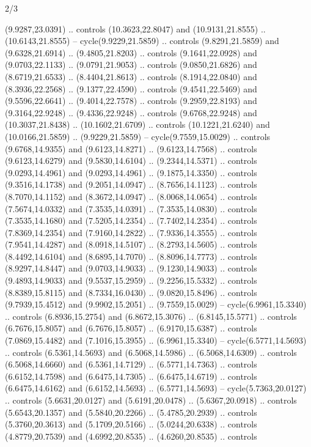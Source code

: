 \begin{flagdescription}{2/3}
\begin{scope}[yshift=\flagwidth,scale=\flagwidth/1241.93737]
\begin{scope}[y=-1mm, x=1mm,draw=gold,fill=blue,line join=miter,miter limit=4,line width=1.8\lw]
{  (9.9287,23.0391) .. controls (10.3623,22.8047) and (10.9131,21.8555) ..
  (10.6143,21.8555) -- cycle(9.9229,21.5859) .. controls (9.8291,21.5859) and
  (9.6328,21.6914) .. (9.4805,21.8203) .. controls (9.1641,22.0928) and
  (9.0703,22.1133) .. (9.0791,21.9053) .. controls (9.0850,21.6826) and
  (8.6719,21.6533) .. (8.4404,21.8613) .. controls (8.1914,22.0840) and
  (8.3936,22.2568) .. (9.1377,22.4590) .. controls (9.4541,22.5469) and
  (9.5596,22.6641) .. (9.4014,22.7578) .. controls (9.2959,22.8193) and
  (9.3164,22.9248) .. (9.4336,22.9248) .. controls (9.6768,22.9248) and
  (10.3037,21.8438) .. (10.1602,21.6709) .. controls (10.1221,21.6240) and
  (10.0166,21.5859) .. (9.9229,21.5859) -- cycle(9.7559,15.0029) .. controls
  (9.6768,14.9355) and (9.6123,14.8271) .. (9.6123,14.7568) .. controls
  (9.6123,14.6279) and (9.5830,14.6104) .. (9.2344,14.5371) .. controls
  (9.0293,14.4961) and (9.0293,14.4961) .. (9.1875,14.3350) .. controls
  (9.3516,14.1738) and (9.2051,14.0947) .. (8.7656,14.1123) .. controls
  (8.7070,14.1152) and (8.3672,14.0947) .. (8.0068,14.0654) .. controls
  (7.5674,14.0332) and (7.3535,14.0391) .. (7.3535,14.0830) .. controls
  (7.3535,14.1680) and (7.5205,14.2354) .. (7.7402,14.2354) .. controls
  (7.8369,14.2354) and (7.9160,14.2822) .. (7.9336,14.3555) .. controls
  (7.9541,14.4287) and (8.0918,14.5107) .. (8.2793,14.5605) .. controls
  (8.4492,14.6104) and (8.6895,14.7070) .. (8.8096,14.7773) .. controls
  (8.9297,14.8447) and (9.0703,14.9033) .. (9.1230,14.9033) .. controls
  (9.4893,14.9033) and (9.5537,15.2959) .. (9.2256,15.5332) .. controls
  (8.8389,15.8115) and (8.7334,16.0430) .. (9.0820,15.8496) .. controls
  (9.7939,15.4512) and (9.9902,15.2051) .. (9.7559,15.0029) --
  cycle(6.9961,15.3340) .. controls (6.8936,15.2754) and (6.8672,15.3076) ..
  (6.8145,15.5771) .. controls (6.7676,15.8057) and (6.7676,15.8057) ..
  (6.9170,15.6387) .. controls (7.0869,15.4482) and (7.1016,15.3955) ..
  (6.9961,15.3340) -- cycle(6.5771,14.5693) .. controls (6.5361,14.5693) and
  (6.5068,14.5986) .. (6.5068,14.6309) .. controls (6.5068,14.6660) and
  (6.5361,14.7129) .. (6.5771,14.7363) .. controls (6.6152,14.7598) and
  (6.6475,14.7305) .. (6.6475,14.6719) .. controls (6.6475,14.6162) and
  (6.6152,14.5693) .. (6.5771,14.5693) -- cycle(5.7363,20.0127) .. controls
  (5.6631,20.0127) and (5.6191,20.0478) .. (5.6367,20.0918) .. controls
  (5.6543,20.1357) and (5.5840,20.2266) .. (5.4785,20.2939) .. controls
  (5.3760,20.3613) and (5.1709,20.5166) .. (5.0244,20.6338) .. controls
  (4.8779,20.7539) and (4.6992,20.8535) .. (4.6260,20.8535) .. controls
}
\end{scope}
\end{scope}
\end{flagdescription}
